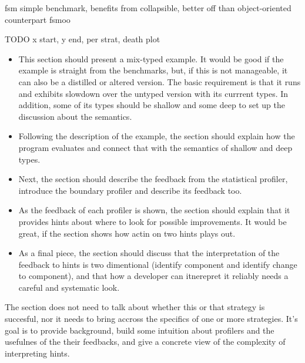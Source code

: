 fsm simple benchmark,
benefits from collapsible, better off than object-oriented counterpart fsmoo



TODO x start, y end, per strat, death plot

\begin{itemize}
  \item This section should present a mix-typed example. It would be good
    if the example is straight from the benchmarks, but, if this is not
    manageable, it can also be a distilled or altered version.  The basic
    requirement is that it runs and exhibits slowdown over the untyped
    version with its currrent types. In addition, some of its types should
    be shallow and some deep to set up the discussion about the
    semantics.
  \item Following the description of the example,  
    the section should explain how the program evaluates and connect that with the
    semantics of shallow and deep types. 
  \item Next, the section should describe the feedback from the statistical
    profiler, introduce the boundary profiler  and 
    describe its feedback too. 
  \item As the feedback of each profiler is shown, the section should 
    explain that it provides hints about where to look for
    possible improvements. It would be great, if the section shows how
    actin on two hints plays out.  
  \item As a final piece, the section should discuss that the
    interpretation
    of the feedback to hints is two dimentional (identify component and
    identify change to component), and that how a developer can itnerepret
    it reliably needs a careful and systematic look.
\end{itemize}


The section does not need to talk about whether this or that strategy is
succesful, nor it needs to bring accross the specifics of one or more
strategies. It's goal is to provide background, build some intuition about
profilers and the usefulnes of the their feedbacks, and give a concrete view of
 the complexity of interpreting hints.


